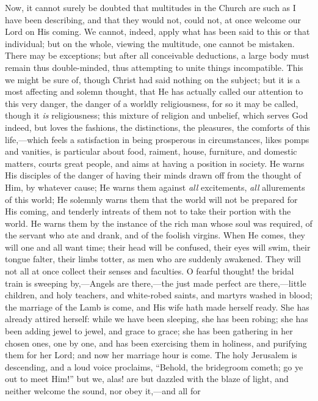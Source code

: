 Now, it cannot surely be doubted that multitudes in the Church are
such as I have been describing, and that they would not, could not, at
once welcome our Lord on His coming. We cannot, indeed, apply what has
been said to this or that individual; but on the whole, viewing the
multitude, one cannot be mistaken. There may be exceptions; but after
all conceivable deductions, a large body must remain thus
double-minded, thus attempting to unite things incompatible. This we
might be sure of, though Christ had said nothing on the subject; but
it is a most affecting and solemn thought, that He has actually called
our attention to this very danger, the danger of a worldly
religiousness, for so it may be called, though it \emph{is}
religiousness; this mixture of religion and unbelief, which serves God
indeed, but loves the fashions, the distinctions, the pleasures, the
comforts of this life,—which feels a satisfaction in being
prosperous in circumstances, likes pomps and vanities, is particular
about food, raiment, house, furniture, and domestic matters, courts
great people, and aims at having a position in society. He warns His
disciples of the danger of having their minds drawn off from the
thought of Him, by whatever cause; He warns them against \emph{all}
excitements, \emph{all} allurements of this world; He solemnly warns
them that the world will not be prepared for His coming, and tenderly
intreats of them not to take their portion with the world. He warns
them by the instance of the rich man whose soul was required, of the
servant who ate and drank, and of the foolish virgins. When He comes,
they will one and all want time; their head will be confused, their
eyes will swim, their tongue falter, their limbs totter, as men who
are suddenly awakened. They will not all at once collect their senses
and faculties. O fearful thought! the bridal train is sweeping by,—Angels
are there,—the just made perfect are there,—little children, and
holy teachers, and white-robed saints, and martyrs washed in blood;
the marriage of the Lamb is come, and His wife hath made herself
ready. She has already attired herself: while we have been sleeping,
she has been robing; she has been adding jewel to jewel, and grace to
grace; she has been gathering in her chosen ones, one by one, and has
been exercising them in holiness, and purifying them for her Lord; and
now her marriage hour is come. The holy Jerusalem is descending, and a
loud voice proclaims, ``Behold, the bridegroom cometh; go ye out
to meet Him!'' but we, alas! are but dazzled with the blaze of
light, and neither welcome the sound, nor obey it,—and all for
